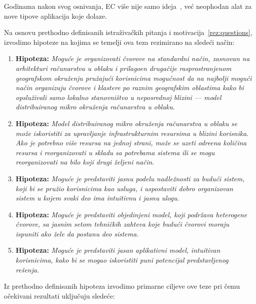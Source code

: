 Godinama nakon svog osnivanja, EC vi\v se nije samo ideja~\cite{SatyanarayananK19}, ve\'c neophodan alat za nove tipove aplikacija koje dolaze.

Na osnovu prethodno definisanih istra\v ziva\v ckih pitanja i motivacija~\ref{rez:questions}, izvodimo hipoteze na kojima se temelji ova teza rezimirano na slede\'ci na\v cin:

\begin{enumerate}[start=1,label={(\bfseries \arabic*)}]
	\item \textbf{Hipoteza:} \textit{Mogu\'ce je organizovati \v cvorove na standardni na\v cin, zasnovan na arhitekturi ra\v cunarstva u oblaku i prilago\dj en druga\v cije rasprostranjenom geografskom okru\v zenju pru\v zaju\'ci korisnicima mogu\'cnost da na najbolji mogu\'ci na\v cin organizuju \v cvorove i klastere po raznim geografskim oblastima kako bi opslu\v zivali samo lokalno stanovni\v stvo u neposrednoj blizini –-- model distribuiranog mikro okru\v zenja ra\v cunarstva u oblaku.}
	\item \textbf{Hipoteza:} \textit{Model distribuiranog mikro okru\v zenja ra\v cunarstva u oblaku se mo\v ze iskoristiti za upravljanje infrastrukturnim resursima u blizini korisnika. Ako je potrebno vi\v se resursa na jednoj strani, mo\v ze se uzeti odre\dj ena koli\v cina resursa i reorganizovati u skladu sa potrebama sistema ili se mogu reorganizovati na bilo koji drugi \v zeljeni na\v cin.}
	\item \textbf{Hipoteza:} \textit{Mogu\'ce je predstaviti jasnu podelu nadle\v znosti za budu\'ci sistem, koji bi se pru\v zio korisnicima kao usluga, i uspostaviti dobro organizovan sistem u kojem svaki deo ima intuitivnu i jasnu ulogu.}
	\item \textbf{Hipoteza:} \textit{Mogu\'ce je predstaviti objedinjeni model, koji podr\v zava heterogene \v cvorove, sa jasnim setom tehni\v ckih zahteva koje budu\'ci \v cvorovi moraju ispuniti ako \v zele da postanu deo sistema.}
	\item \textbf{Hipoteza:} \textit{Mogu\'ce je predstaviti jasan aplikativni model, intuitivan korisnicima, kako bi se mogao iskoristiti puni potencijal predstavljenog re\v senja.}
\end{enumerate}

Iz prethodno definisanih hipoteza izvodimo primarne ciljeve ove teze pri \v cemu o\v cekivani rezultati uklju\v cuju slede\'ce:

